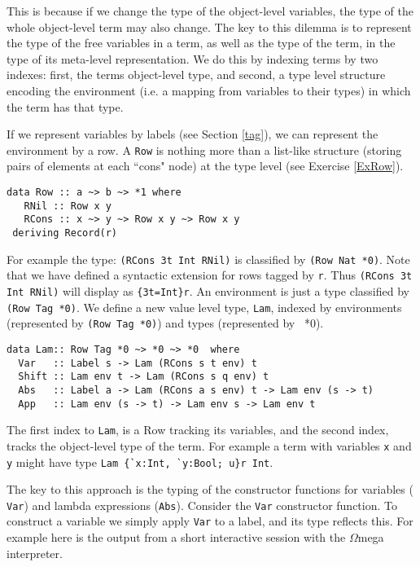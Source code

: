 \documentclass[11pt,twoside,A4]{llncs}
\newcommand{\om}{\emph{$\Omega$}mega}
\begin{document}
This is because if we change the type of the object-level variables,
the type of the whole object-level term may also change. The key
to this dilemma is to represent the type of the free variables
in a term, as well as the type of the term, in the type of its
meta-level representation. We do this by indexing terms by two
indexes: first, the terms object-level type, and second, a type
level structure encoding the environment (i.e. a mapping from
variables to their types) in which the term has that type.

If we represent variables by labels (see Section \ref{tag}), we can
represent the environment by a row. A {\tt Row} is nothing
more than a list-like structure (storing pairs of elements at each ``cons" node) at the
type level (see Exercise \ref{ExRow}).

{\small
\begin{verbatim}
data Row :: a ~> b ~> *1 where
   RNil :: Row x y
   RCons :: x ~> y ~> Row x y ~> Row x y
 deriving Record(r)
\end{verbatim} }
For example the type: \verb+(RCons 3t Int RNil)+ is classified by {\tt (Row Nat *0)}.
Note that we have defined a syntactic extension for rows tagged by {\tt r}. Thus
\verb+(RCons 3t Int RNil)+ will display as \verb+{3t=Int}r+. An environment is just a
type classified by {\tt (Row Tag *0)}. We define a new value level type, {\tt Lam},
indexed by environments (represented by  {\tt (Row Tag *0)}) and types (represented by {\ *0}).

{\small
\begin{verbatim}
data Lam:: Row Tag *0 ~> *0 ~> *0  where
  Var   :: Label s -> Lam (RCons s t env) t
  Shift :: Lam env t -> Lam (RCons s q env) t
  Abs   :: Label a -> Lam (RCons a s env) t -> Lam env (s -> t)
  App   :: Lam env (s -> t) -> Lam env s -> Lam env t
\end{verbatim}}

The first index to {\tt Lam}, is a Row tracking its variables,
and the second index, tracks the object-level type of the term.
For example a term with variables {\tt x} and {\tt y} might have type
\verb+Lam {`x:Int, `y:Bool; u}r Int+.

The key to this approach is the typing of the constructor functions for variables ({\tt
Var}) and lambda expressions ({\tt Abs}). Consider the {\tt Var} constructor
function. To construct a variable we simply apply {\tt Var} to a label, and its type
reflects this. For example here is the output from a short interactive session with the
\om~ interpreter.
\end{document}
